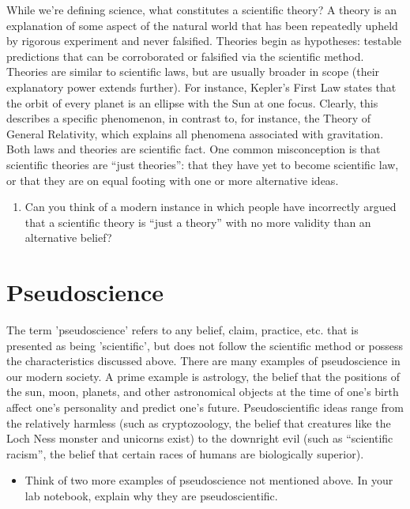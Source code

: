 \documentclass[11pt]{article}
\begin{document}
While we're defining science, what constitutes a scientific theory? A theory is an explanation of some aspect of the natural world that has been repeatedly upheld by rigorous experiment and never falsified. Theories begin as hypotheses: testable predictions that can be corroborated or falsified via the scientific method. Theories are similar to scientific laws, but are usually broader in scope (their explanatory power extends further). For instance, Kepler's First Law states that the orbit of every planet is an ellipse with the Sun at one focus. Clearly, this describes a specific phenomenon, in contrast to, for instance, the Theory of General Relativity, which explains all phenomena associated with gravitation. Both laws and theories are scientific fact. One common misconception is that scientific theories are ``just theories'': that they have yet to become scientific law, or that they are on equal footing with one or more alternative ideas.

\begin{enumerate}
    \item Can you think of a modern instance in which people have incorrectly argued that a scientific theory is ``just a theory'' with no more validity than an alternative belief?
\end{enumerate}

\section{Pseudoscience}
The term 'pseudoscience' refers to any belief, claim, practice, etc. that is presented as being 'scientific', but does not follow the scientific method or possess the characteristics discussed above. There are many examples of pseudoscience in our modern society. A prime example is astrology, the belief that the positions of the sun, moon, planets, and other astronomical objects at the time of one's birth affect one's personality and predict one's future. Pseudoscientific ideas range from the relatively harmless (such as cryptozoology, the belief that creatures like the Loch Ness monster and unicorns exist) to the downright evil (such as ``scientific racism'', the belief that certain races of humans are biologically superior).

\begin{itemize}
    \item Think of two more examples of pseudoscience not mentioned above. In your lab notebook, explain why they are pseudoscientific.
\end{itemize}
\end{document}
